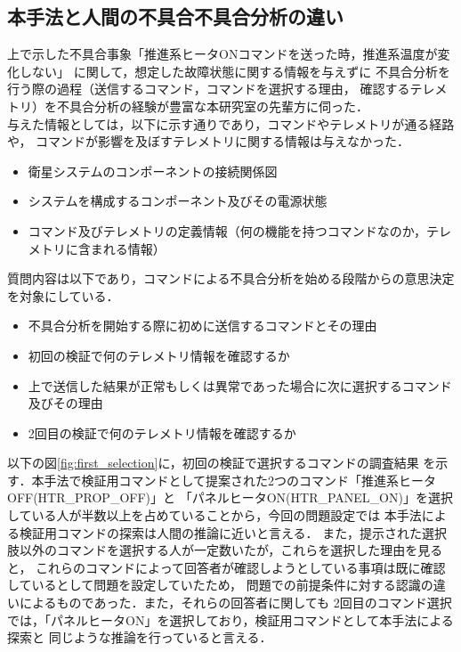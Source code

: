 \documentclass[11pt]{jsreport}
\begin{document}
\subsection{本手法と人間の不具合不具合分析の違い}
上で示した不具合事象「推進系ヒータONコマンドを送った時，推進系温度が変化しない」
に関して，想定した故障状態に関する情報を与えずに
不具合分析を行う際の過程（送信するコマンド，コマンドを選択する理由，
確認するテレメトリ）を不具合分析の経験が豊富な本研究室の先輩方に伺った．\\
与えた情報としては，以下に示す通りであり，コマンドやテレメトリが通る経路や，
コマンドが影響を及ぼすテレメトリに関する情報は与えなかった．
\begin{itemize}
   \item 衛星システムのコンポーネントの接続関係図
   \item システムを構成するコンポーネント及びその電源状態
   \item コマンド及びテレメトリの定義情報（何の機能を持つコマンドなのか，テレメトリに含まれる情報）
\end{itemize}
質問内容は以下であり，コマンドによる不具合分析を始める段階からの意思決定を対象にしている．
\begin{itemize}
   \item 不具合分析を開始する際に初めに送信するコマンドとその理由
   \item 初回の検証で何のテレメトリ情報を確認するか
   \item 上で送信した結果が正常もしくは異常であった場合に次に選択するコマンド及びその理由
   \item 2回目の検証で何のテレメトリ情報を確認するか
\end{itemize}
以下の図\ref{fig:first_selection}に，初回の検証で選択するコマンドの調査結果
を示す．本手法で検証用コマンドとして提案された2つのコマンド「推進系ヒータOFF(HTR\_PROP\_OFF)」と
「パネルヒータON(HTR\_PANEL\_ON)」を選択している人が半数以上を占めていることから，今回の問題設定では
本手法による検証用コマンドの探索は人間の推論に近いと言える．
また，提示された選択肢以外のコマンドを選択する人が一定数いたが，これらを選択した理由を見ると，
これらのコマンドによって回答者が確認しようとしている事項は既に確認しているとして問題を設定していたため，
問題での前提条件に対する認識の違いによるものであった．また，それらの回答者に関しても
2回目のコマンド選択では，「パネルヒータON」を選択しており，検証用コマンドとして本手法による探索と
同じような推論を行っていると言える．
\end{document}
